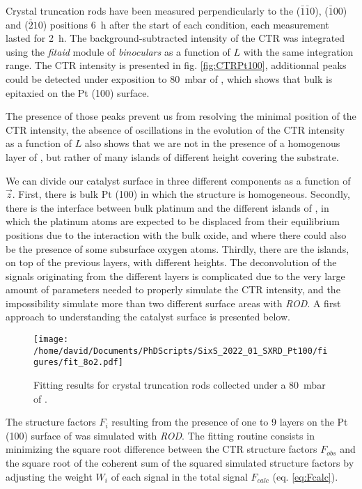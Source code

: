 Crystal truncation rods have been measured perpendicularly to the ($\bar{1}\bar{1}0$), ($\bar{1}00$) and ($\bar{2}10$) positions \qty{6}{\hour} after the start of each condition, each measurement lasted for \qty{2}{\hour}.
The background-subtracted intensity of the CTR was integrated using the \textit{fitaid} module of \textit{binoculars} as a function of $L$ with the same integration range.
The CTR intensity is presented in fig. \ref{fig:CTRPt100}, additionnal peaks could be detected under exposition to \qty{80}{\milli\bar} of \dioxygen, which shows that bulk  is epitaxied on the Pt (100) surface.

The presence of those peaks prevent us from resolving the minimal position of the CTR intensity, the absence of oscillations in the evolution of the CTR intensity as a function of $L$ also shows that we are not in the presence of a homogenous layer of , but rather of many islands of different height covering the substrate.

We can divide our catalyst surface in three different components as a function of $\vec{z}$.
First, there is bulk Pt (100) in which the structure is homogeneous.
Secondly, there is the interface between bulk platinum and the different islands of , in which the platinum atoms are expected to be displaced from their equilibrium positions due to the interaction with the bulk oxide, and where there could also be the presence of some subsurface oxygen atoms.
Thirdly, there are the  islands, on top of the previous layers, with different heights.
The deconvolution of the signals originating from the different layers is complicated due to the very large amount of parameters needed to properly simulate the CTR intensity, and the impossibility simulate more than two different surface areas with \textit{ROD}.
A first approach to understanding the catalyst surface is presented below.

\begin{figure}[!htb]
    \centering
    \texttt{[image: /home/david/Documents/PhDScripts/SixS\_2022\_01\_SXRD\_Pt100/figures/fit\_8o2.pdf]}
    \caption{
        Fitting results for crystal truncation rods collected under a \qty{80}{\milli\bar} of \dioxygen.
    }
    \label{fig:CTRFitHighOxygen}
\end{figure}

The structure factors $F_i$ resulting from the presence of one to 9 layers on the Pt (100) surface of  was simulated with \textit{ROD}.
The fitting routine consists in minimizing the square root difference between the CTR structure factors $F_{obs}$ and the square root of the  coherent sum of the squared simulated structure factors by adjusting the weight $W_i$ of each signal in the total signal $F_{calc}$ (eq. \ref{eq:Fcalc}).

